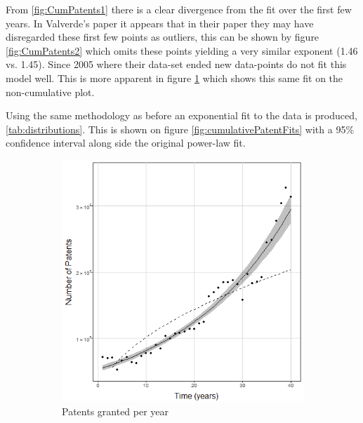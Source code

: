 From \ref{fig:CumPatents1} there is a clear divergence from the fit over the first few years. In Valverde's paper it appears that in their paper they may have disregarded these first few points as outliers, this can be shown by figure \ref{fig:CumPatents2} which omits these points yielding a very similar exponent (1.46 vs. 1.45). Since 2005 where their data-set ended new data-points do not fit this model well. This is more apparent in figure \ref{fig:patentCountFit} which shows this same fit on the non-cumulative plot. 

Using the same methodology as before an exponential fit to the data is produced, \ref{tab:distributions}. This is shown on figure \ref{fig:cumulativePatentFits} with a 95\% confidence interval along side the original power-law fit. 

\begin{figure}
\centering
\begin{subfigure}{.3\linewidth}
  \centering
  \includegraphics[width=0.9\linewidth]{Figures/patentCountFit}
 \caption[CumPatents1]{\footnotesize Patents granted per year}
\label{fig:patentCountFit}
\end{subfigure}%
\begin{subfigure}{.3\linewidth}
  \centering

\end{subfigure}
\end{figure}
